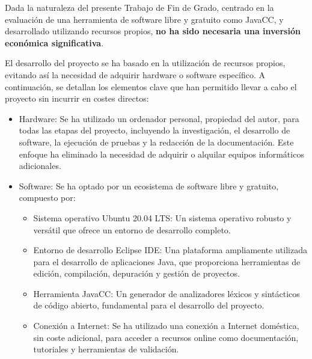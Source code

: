 \noindent Dada la naturaleza del presente Trabajo de Fin de Grado, centrado en la evaluación de una herramienta de software libre y gratuito como JavaCC, y desarrollado utilizando recursos propios, \textbf{no ha sido necesaria una inversión económica significativa}.





El desarrollo del proyecto se ha basado en la utilización de recursos propios, evitando así la necesidad de adquirir hardware o software específico. A continuación, se detallan los elementos clave que han permitido llevar a cabo el proyecto sin incurrir en costes directos:
\begin{itemize}
    \item Hardware: Se ha utilizado un ordenador personal, propiedad del autor, para todas las etapas del proyecto, incluyendo la investigación, el desarrollo de software, la ejecución de pruebas y la redacción de la documentación. Este enfoque ha eliminado la necesidad de adquirir o alquilar equipos informáticos adicionales.
    \item Software: Se ha optado por un ecosistema de software libre y gratuito, compuesto por:
    \begin{itemize}
        \item Sistema operativo Ubuntu 20.04 LTS: Un sistema operativo robusto y versátil que ofrece un entorno de desarrollo completo.
        \item Entorno de desarrollo Eclipse IDE: Una plataforma ampliamente utilizada para el desarrollo de aplicaciones Java, que proporciona herramientas de edición, compilación, depuración y gestión de proyectos.
        \item Herramienta JavaCC: Un generador de analizadores léxicos y sintácticos de código abierto, fundamental para el desarrollo del proyecto.
        \item Conexión a Internet: Se ha utilizado una conexión a Internet doméstica, sin coste adicional, para acceder a recursos online como documentación, tutoriales y herramientas de validación.
    \end{itemize}
\end{itemize}

